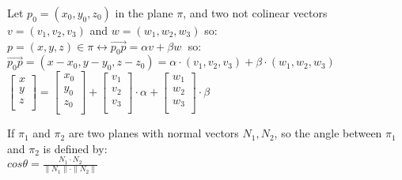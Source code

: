 \begin{definition}
  Let $p_{\scriptstyle{0}} = (x_{\scriptstyle{0}}, y_{\scriptstyle{0}}, z_{\scriptstyle{0}})$ in the plane $\pi$, and two not colinear vectors
  $v = (v_{\scriptstyle{1}}, v_{\scriptstyle{2}}, v_{\scriptstyle{3}})$ and $w = (w_{\scriptstyle{1}}, w_{\scriptstyle{2}}, w_{\scriptstyle{3}})$ so: \\

  $p = (x, y, z) \in \pi \leftrightarrow \vec{p_{\scriptstyle{0}}p} = \alpha v + \beta w \;$ so:  \\
  $\vec{p_{\scriptstyle{0}}p} = (x - x_{\scriptstyle{0}}, y - y_{\scriptstyle{0}}, z - z_{\scriptstyle{0}}) = \alpha \cdot (v_{\scriptstyle{1}}, v_{\scriptstyle{2}}, v_{\scriptstyle{3}}) + \beta \cdot (w_{\scriptstyle{1}}, w_{\scriptstyle{2}}, w_{\scriptstyle{3}})$ \\

  $\begin{bmatrix}
    x \\
    y \\
    z \\
  \end{bmatrix} = 
  \begin{bmatrix}
    x_{\scriptstyle{0}} \\
    y_{\scriptstyle{0}} \\
    z_{\scriptstyle{0}} \\
  \end{bmatrix}
  +
  \begin{bmatrix}
    v_{\scriptstyle{1}} \\
    v_{\scriptstyle{2}} \\
    v_{\scriptstyle{3}} \\
  \end{bmatrix} \cdot \alpha
  + 
  \begin{bmatrix}
    w_{\scriptstyle{1}} \\
    w_{\scriptstyle{2}} \\
    w_{\scriptstyle{3}} \\
  \end{bmatrix}  \cdot \beta $
\end{definition}

\begin{theorem}
  If $\pi_{\scriptstyle{1}}$ and $\pi_{\scriptstyle{2}}$ are two planes with normal vectors $N_{\scriptstyle{1}}, N_{\scriptstyle{2}}$,
  so the angle between $\pi_{\scriptstyle{1}}$ and $\pi_{\scriptstyle{2}}$ is defined by: \\

  $cos \theta = \frac{N_{\scriptstyle{1}} \cdot N_{\scriptstyle{2}}}{\|N_{\scriptstyle{1}}\| \cdot \|N_{\scriptstyle{2}}\|}$
\end{theorem}

